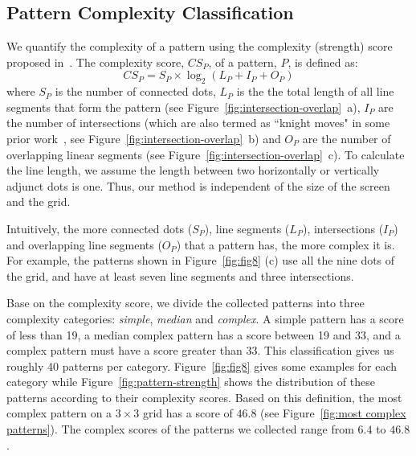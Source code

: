     \subsection{Pattern Complexity Classification}
    We quantify the complexity of a pattern using the complexity (strength) score proposed in~\cite{sun2014dissecting}.
        The complexity score, $CS_{P}$, of a pattern, $P$, is defined as:
    \begin{equation}
      CS_{P}=S_{P}\times\log_{2}(L_{P}+I_{P}+O_{P})
    \label{equ:compscore}
    \end{equation}
    where $S_{P}$ is the number of connected dots, $L_{P}$ is the the total length of all line segments that form the pattern (see Figure~\ref{fig:intersection-overlap}~a), $I_{P}$ are the number of intersections (which are also termed as ``knight moves" in some prior work~\cite{vonZezschwitz:2015:EDB:2702123.2702202}, see Figure~\ref{fig:intersection-overlap}~b) and $O_{P}$ are the number of overlapping linear segments (see Figure~\ref{fig:intersection-overlap}~c).  To calculate the line length, we assume the length between two horizontally or vertically adjunct dots is one. Thus, our method is independent of the size of the screen and the grid.


    Intuitively, the more connected dots ($S_{P}$), line segments ($L_{P}$),
    intersections ($I_{P}$) and overlapping line segments ($O_{P}$) that a
    pattern has, the more complex it is. For example, the patterns shown in
    Figure~\ref{fig:fig8} (c) use all the nine dots of the grid, and have  at
    least seven line segments and three intersections. %


    Base on the complexity score, we divide the collected patterns into three complexity categories: \emph{simple}, \emph{median} and \emph{complex}. A simple pattern has a score of less than 19,
    a median
    complex pattern has a score between 19 and 33, and a complex pattern must have a score greater than 33. This classification gives us roughly 40 patterns per
    category. Figure~\ref{fig:fig8} gives some examples for each category while Figure~\ref{fig:pattern-strength} shows the distribution of these patterns according to their complexity scores.
    Based on this definition, the most complex pattern on a $3 \times 3$ grid has a score of $46.8$ (see Figure~\ref{fig:most complex patterns}).  The complex scores of the patterns we collected range from $6.4$ to $46.8$.
        
